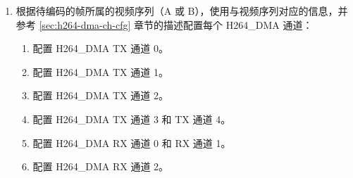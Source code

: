 \documentclass[main\_\_CN.tex]{subfiles}
\begin{document}
\begin{enumerate}
\begin{enumerate}
            \begin{itemize}
                \item \hyperref[fielddesc:H264SLICEBYTEMSB]{H264\_SLICE\_BYTE\_MSB}：切片头的第 41 位到第 10 位
                \item \hyperref[fielddesc:H264SLICEBYTELSB]{H264\_SLICE\_BYTE\_LSB}：切片头的第 9 位到第 2 位
                \item \hyperref[fielddesc:H264SLICEREMAINBIT]{H264\_SLICE\_REMAIN\_BIT}：切片头的第 1 位
                \item \hyperref[fielddesc:H264SLICEBYTELENGTH]{H264\_SLICE\_BYTE\_LENGTH}：5
                \item \hyperref[fielddesc:H264SLICEREMAINBITLENGTH]{H264\_SLICE\_REMAIN\_BITLENGTH}：1
            \end{itemize}
        \item 配置原始视频色彩空间：将寄存器 \hyperref[fielddesc:H264AORICOLORSPACE]{H264\_A\_ORI\_COLOR\_SPACE} 配置为视频序列 A 对应的原始视频色彩空间。将寄存器 \hyperref[fielddesc:H264BORICOLORSPACE]{H264\_B\_ORI\_COLOR\_SPACE} 配置为视频序列 B 对应的原始视频色彩空间。
        \item 如需使用量化结果降采样功能，请参考 \ref{sec:h264-decimate} 章节配置相关寄存器。
        \item 如需使用宏块级码率控制功能，请参考 \ref{sec:h264-rate-ctrl} 章节配置相关寄存器。
        \item 如需使用 ROI 功能，请参考 \ref{sec:h264-roi} 章节配置相关寄存器。
        \item 如需使用 MV 合并功能，请参考 \ref{sec:h264-mv-merge} 章节配置相关寄存器。
        \item 如需使用调试功能，请参考 \ref{sec:h264-debug-func} 章节配置相关寄存器。
    \end{enumerate}
    \item\label{item:h264-dual-dma} 根据待编码的帧所属的视频序列（A 或 B），使用与视频序列对应的信息，并参考 \ref{sec:h264-dma-ch-cfg} 章节的描述配置每个 H264\_DMA 通道：
    \begin{enumerate}
        \item 配置 H264\_DMA TX 通道 0。
        \item 配置 H264\_DMA TX 通道 1。
        \item 配置 H264\_DMA TX 通道 2。
        \item 配置 H264\_DMA TX 通道 3 和 TX 通道 4。
        \item 配置 H264\_DMA RX 通道 0 和 RX 通道 1。
        \item 配置 H264\_DMA RX 通道 2。

\end{enumerate}
\end{enumerate}
\end{document}
